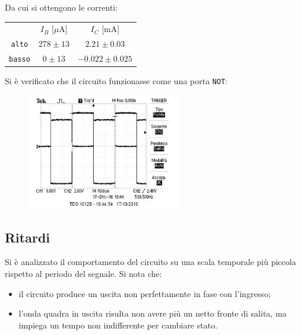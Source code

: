 \documentclass[10pt,a4paper]{article}
\def\code#1{\texttt{#1}}
\begin{document}
Da cui si ottengono le correnti:

\begin{table}[h!]
\centering
\begin{tabular}{c|c|c}
 & $I_B$ [$\mu$A]& $I_C$ [mA]\\
\code{alto} & $278 \pm 13$ & $2.21 \pm 0.03$\\
\code{basso} & $0 \pm 13 $ & $-0.022 \pm 0.025$
\end{tabular}
\end{table}

Si è verificato che il circuito funzionasse come una porta \code{NOT}:

\begin{figure}[h!]
	\centering
	\includegraphics[width=0.6\textwidth]{../oscilloscopio/not_tarocco.jpg}
	\caption{}
\end{figure}

\subsection{Ritardi}
Si è analizzato il comportamento del circuito su una scala temporale più piccola rispetto al periodo del segnale. Si nota che:
\begin{itemize}
\item il circuito produce un uscita non perfettamente in fase con l'ingresso;
\item l'onda quadra in uscita risulta non avere più un netto fronte di salita, ma impiega un tempo non indifferente per cambiare stato.
\end{itemize}
\end{document}
